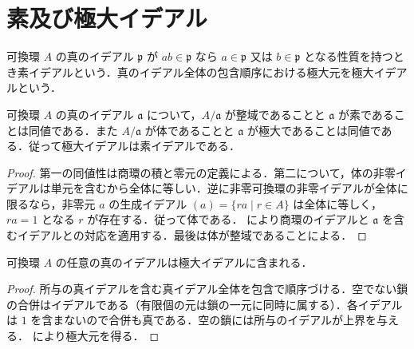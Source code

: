 \section{素及び極大イデアル}
\begin{defn}[素イデアルと極大イデアル]
可換環 $A$ の真のイデアル $\mathfrak p$ が $ab\in\mathfrak p$ なら $a\in\mathfrak p$ 又は $b\in\mathfrak p$ となる性質を持つとき素イデアルという．真のイデアル全体の包含順序における極大元を極大イデアルという．
\end{defn}
\begin{prop}[体と整域の商環による判定]
可換環 $A$ の真のイデアル $\mathfrak a$ について，$A/\mathfrak a$ が整域であることと $\mathfrak a$ が素であることは同値である．また $A/\mathfrak a$ が体であることと $\mathfrak a$ が極大であることは同値である．従って極大イデアルは素イデアルである．
\end{prop}
\begin{proof}
第一の同値性は商環の積と零元の定義による．第二について，体の非零イデアルは単元を含むから全体に等しい．逆に非零可換環の非零イデアルが全体に限るなら，非零元 $a$ の生成イデアル $(a)=\{ra\mid r\in A\}$ は全体に等しく，$ra=1$ となる $r$ が存在する．従って体である． により商環のイデアルと $\mathfrak a$ を含むイデアルとの対応を適用する．最後は体が整域であることによる．
\end{proof}
\begin{prop}[極大イデアルの存在]
可換環 $A$ の任意の真のイデアルは極大イデアルに含まれる．
\end{prop}
\begin{proof}
所与の真イデアルを含む真イデアル全体を包含で順序づける．空でない鎖の合併はイデアルである（有限個の元は鎖の一元に同時に属する）．各イデアルは $1$ を含まないので合併も真である．空の鎖には所与のイデアルが上界を与える． により極大元を得る．
\end{proof}
